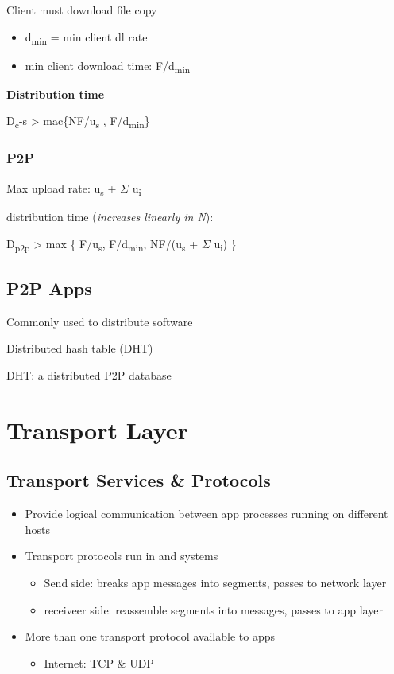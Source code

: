 \documentclass[11pt]{article}
\begin{document}
Client must download file copy
\begin{itemize}
\item d\textsubscript{min} = min client dl rate
\item min client download time: F/d\textsubscript{min}
\end{itemize}

\textbf{Distribution time}

D\textsubscript{c}-s > mac\{NF/u\textsubscript{s} , F/d\textsubscript{min}\}

\subsubsection{P2P}
\label{sec:org9fce038}

Max upload rate:  u\textsubscript{s} + \(\Sigma\) u\textsubscript{i}

distribution time (\emph{increases linearly in N}):

D\textsubscript{p2p} > max \{ F/u\textsubscript{s}, F/d\textsubscript{min}, NF/(u\textsubscript{s} + \(\Sigma\) u\textsubscript{i}) \}





\subsection{P2P Apps}
\label{sec:org2345fe7}
Commonly used to distribute software

Distributed hash table (DHT)

DHT: a distributed P2P database


\section{Transport Layer}
\label{sec:org9668efa}

\subsection{Transport Services \& Protocols}
\label{sec:org9896fbd}
\begin{itemize}
\item Provide logical communication between app processes running on
different hosts
\item Transport protocols run in and systems
\begin{itemize}
\item Send side: breaks app messages into segments, passes to network layer
\item receiveer side: reassemble segments into messages, passes to app
layer
\end{itemize}
\item More than one transport protocol available to apps
\begin{itemize}
\item Internet: TCP \& UDP
\end{itemize}
\end{itemize}
\end{document}
